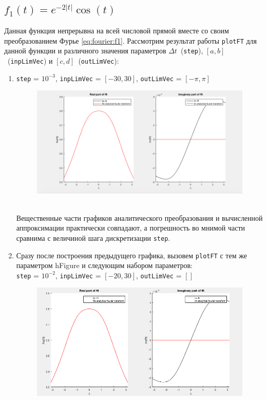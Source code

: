 \documentclass[11pt, oneside, draft]{article}
\numberwithin{equation}{section}
\begin{document}
    \subsection{\(f_1(t) = e^{-2|t|} \cos(t)\)} %
    \label{sub:f1}
    Данная функция непрерывна на всей числовой прямой вместе со своим преобразованием Фурье \eqref{eq:fourier:f1}. Рассмотрим результат работы \texttt{plotFT}
    для данной функции и различного значения параметров \(\Delta t\)~(\texttt{step}), \([a, b]\)~(\texttt{inpLimVec}) и \([c, d]\)~(\texttt{outLimVec}):
    \begin{enumerate}
        \item 
        \texttt{step} = \(10^{-3}\), \texttt{inpLimVec} = \( [-30, 30] \), \texttt{outLimVec} = \( [-\pi, \pi] \)
        \begin{figure}[!h]
            \centering
            \includegraphics[width=\textwidth]{f1fig1}
            \label{pic:f1:1}
        \end{figure} \\
        Вещественные части графиков аналитического преобразования и вычисленной аппроксимации практически совпадают, а погрешность во мнимой части сравнима с величиной
        шага дискретизации \texttt{step}.
        \clearpage
        \item
        Сразу после построения предыдущего графика, вызовем \texttt{plotFT} с тем же параметром hFigure и следующим набором параметров:\\
        \texttt{step} = \(10^{-2}\), \texttt{inpLimVec} = \( [-20, 30] \), \texttt{outLimVec} = \( [] \)
        \begin{figure}[!h]
            \centering
            \includegraphics[width=\textwidth]{f1fig2}

\end{figure}
\end{enumerate}
\end{document}
